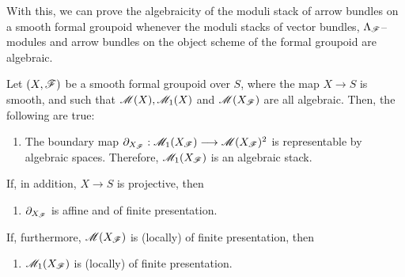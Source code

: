 \documentclass[11pt]{amsart}
\begin{document}
With this, we can prove the algebraicity of the moduli stack of
arrow bundles on a smooth formal groupoid whenever the moduli stacks of vector
bundles, $\Lambda_\mathscr{F}$--modules and arrow bundles on the object scheme of the
formal groupoid are algebraic.

\begin{thm}\label{thm:mod-st-arr-bun-formal-grpd-alg}
Let $(X, \mathscr{F})$ be a smooth formal groupoid over $S$, where the map $X \to S$ is
smooth, and such that $\mathscr{M}(X), \mathscr{M}_1(X)$ and $\mathscr{M}(X_\mathscr{F})$ are all algebraic.
Then, the following are true:
\begin{enumerate}
\item The boundary map $\partial_{X_\sF} : \sM_1(X_\sF) \to \sM(X_\sF)^2$ is
representable by algebraic spaces. Therefore, $\mathscr{M}_1(X_\mathscr{F})$ is an algebraic
stack.
\end{enumerate}
If, in addition, $X \to S$ is projective, then
\begin{enumerate}[resume]
\item $\partial_{X_\mathscr{F}}$ is affine and of finite presentation.
\end{enumerate}
If, furthermore, $\mathscr{M}(X_\mathscr{F})$ is (locally) of finite presentation, then
\begin{enumerate}[resume]
\item $\mathscr{M}_1(X_\mathscr{F})$ is (locally) of finite presentation.
\end{enumerate}
\end{thm}
\end{document}
